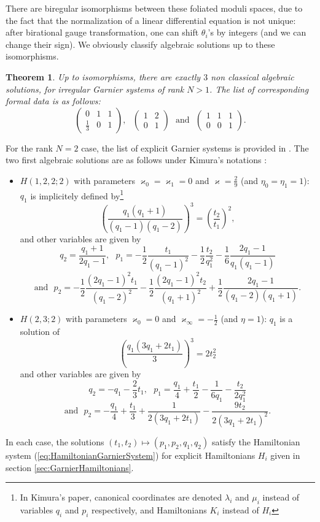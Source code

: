 \documentclass[12]{amsart}
\newtheorem{thm}{Theorem}
\begin{document}
There are biregular isomorphisms between these foliated moduli spaces, due to the fact that
the normalization of a linear differential equation is not unique: after birational gauge transformation,
one can shift $\theta_i$'s by integers (and we can change their sign). 
We obviously classify algebraic solutions up to these isomorphisms.

\begin{thm}\label{thm:3nonclassical}
Up to isomorphisms, there are exactly $3$ non classical algebraic solutions, for irregular Garnier systems 
of rank $N>1$. The list of corresponding formal data is as follows:
$$\begin{pmatrix}0& 1&1\\ \frac{1}{3} & 0&1\end{pmatrix},\ \ \ \begin{pmatrix}1&2\\ 0 & 1\end{pmatrix}\ \ \ \text{and}\ \ \ 
\begin{pmatrix}1& 1&1\\ 0&0 & 1\end{pmatrix}.$$
\end{thm}

For the rank $N=2$ case, the list of explicit Garnier systems is provided in \cite{Kimura,Kawamuko}.
The two first algebraic solutions are as follows under Kimura's notations \cite{Kimura}:
\begin{itemize}
\item $H(1,2,2;2)$ with parameters $\varkappa_0=\varkappa_1=0$ and $\varkappa=\frac{2}{9}$ (and $\eta_0=\eta_1=1$):
$q_1$ is implicitely defined by\footnote{In Kimura's paper, 
canonical coordinates are denoted $\lambda_i$ and $\mu_i$ instead of variables $q_i$ and $p_i$ respectively, 
and Hamiltonians $K_i$ instead of $H_i$}
$$\left(\frac{q_1(q_1+1)}{(q_1-1)(q_1-2)}\right)^3=\left(\frac{t_2}{t_1}\right)^2,$$
and other variables are given by
$$q_2=\frac{q_1+1}{2q_1-1},\ \ \ p_1=-\frac{1}{2}\frac{t_1}{(q_1-1)^2}-\frac{1}{2}\frac{t_2}{q_1^2}-\frac{1}{6}\frac{2q_1-1}{q_1(q_1-1)}$$
$$\text{and}\ \ \ p_2=-\frac{1}{2}\frac{(2q_1-1)^2 t_1}{(q_1-2)^2}-\frac{1}{2}\frac{(2q_1-1)^2 t_2}{(q_1+1)^2}+\frac{1}{2}\frac{2q_1-1}{(q_1-2)(q_1+1)}.$$
\item $H(2,3;2)$ with parameters $\varkappa_0=0$ and $\varkappa_\infty=-\frac{1}{2}$ (and $\eta=1$):
$q_1$ is a solution of
$$\left(\frac{q_1(3q_1+2t_1)}{3}\right)^3=2t_2^2$$
and other variables are given by
$$q_2=-q_1-\frac{2}{3}t_1,\ \ \ p_1=\frac{q_1}{4}+\frac{t_1}{2}-\frac{1}{6q_1}-\frac{t_2}{2q_1^2}$$
$$\text{and}\ \ \ p_2=-\frac{q_1}{4}+\frac{t_1}{3}+\frac{1}{2(3q_1+2t_1)}-\frac{9t_2}{2(3q_1+2t_1)^2}.$$
\end{itemize}
In each case, the solutions $(t_1,t_2)\mapsto(p_1,p_2,q_1,q_2)$ satisfy the Hamiltonian system (\ref{eq:HamiltonianGarnierSystem})
for explicit Hamiltonians $H_i$ given in section \ref{sec:GarnierHamiltonians}.
\end{document}
